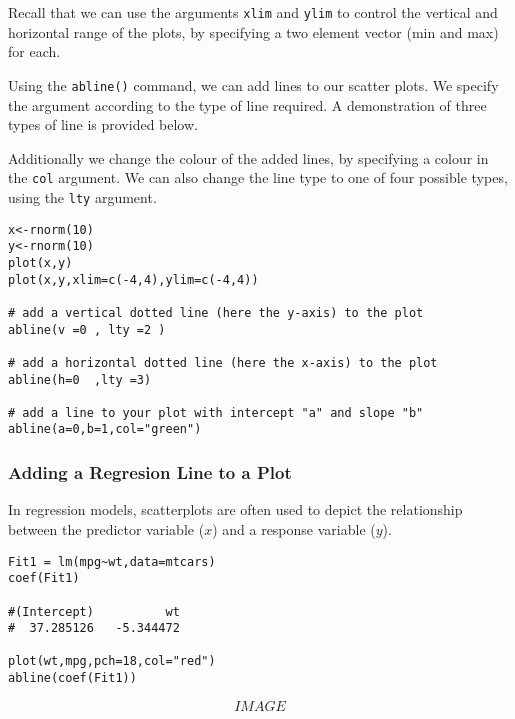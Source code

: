 \documentclass[a4paper,12pt]{article}
\begin{document}
Recall that we can use the arguments \texttt{xlim} and \texttt{ylim} to control the vertical and horizontal range of the plots, by specifying a two element vector (min and max) for each.

Using the \texttt{abline()} command, we can add lines to our scatter plots. We specify the argument according to the type of line required. A demonstration of three types of line is provided below.

Additionally we change the colour of the added lines, by specifying a colour in the \texttt{col} argument. We can also change the line type to one of four possible types, using the \texttt{lty} argument.


\begin{framed} 
\begin{verbatim}
x<-rnorm(10)
y<-rnorm(10)
plot(x,y)
plot(x,y,xlim=c(-4,4),ylim=c(-4,4))

# add a vertical dotted line (here the y-axis) to the plot
abline(v =0 , lty =2 ) 

# add a horizontal dotted line (here the x-axis) to the plot
abline(h=0  ,lty =3)    

# add a line to your plot with intercept "a" and slope "b"
abline(a=0,b=1,col="green") 
\end{verbatim}
\end{framed}
 
\subsubsection{Adding a Regresion Line to a Plot}
In regression models, scatterplots are often used to depict the relationship between the predictor variable ($x$) and a response variable ($y$).


\begin{framed}
\begin{verbatim}
Fit1 = lm(mpg~wt,data=mtcars)
coef(Fit1)

#(Intercept)          wt 
#  37.285126   -5.344472 

plot(wt,mpg,pch=18,col="red")
abline(coef(Fit1))
\end{verbatim}
\end{framed}
\[IMAGE\]
\end{document}
